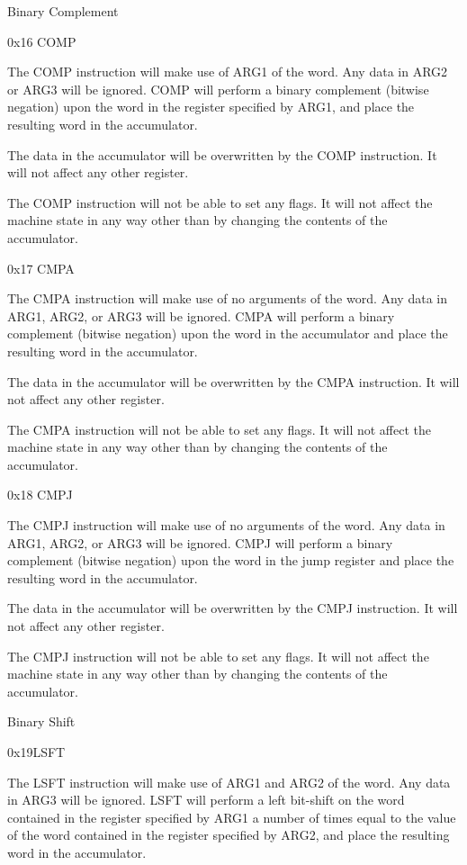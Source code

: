 \documentclass[]{article}
\begin{document}
Binary Complement

0x16 COMP

The COMP instruction will make use of ARG1 of the word. Any data in ARG2
or ARG3 will be ignored. COMP will perform a binary complement (bitwise
negation) upon the word in the register specified by ARG1, and place the
resulting word in the accumulator.~

The data in the accumulator will be overwritten by the COMP instruction.
It will not affect any other register.

The COMP instruction will not be able to set any flags. It will not
affect the machine state in any way other than by changing the contents
of the accumulator.

0x17 CMPA

The CMPA instruction will make use of no arguments of the word. Any data
in ARG1, ARG2, or ARG3 will be ignored. CMPA will perform a binary
complement (bitwise negation) upon the word in the accumulator and place
the resulting word in the accumulator.

The data in the accumulator will be overwritten by the CMPA instruction.
It will not affect any other register.

The CMPA instruction will not be able to set any flags. It will not
affect the machine state in any way other than by changing the contents
of the accumulator.

0x18 CMPJ

The CMPJ instruction will make use of no arguments of the word. Any data
in ARG1, ARG2, or ARG3 will be ignored. CMPJ will perform a binary
complement (bitwise negation) upon the word in the jump register and
place the resulting word in the accumulator.

The data in the accumulator will be overwritten by the CMPJ instruction.
It will not affect any other register.

The CMPJ instruction will not be able to set any flags. It will not
affect the machine state in any way other than by changing the contents
of the accumulator.

Binary Shift

0x19LSFT

The LSFT instruction will make use of ARG1 and ARG2 of the word. Any
data in ARG3 will be ignored. LSFT will perform a left bit-shift on the
word contained in the register specified by ARG1 a number of times equal
to the value of the word contained in the register specified by ARG2,
and place the resulting word in the accumulator.
\end{document}
